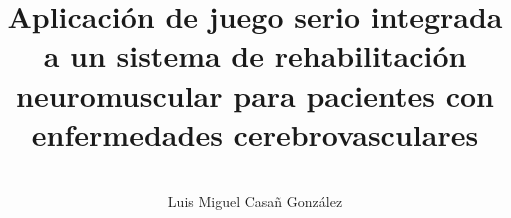 \documentclass{thesis}
\title{Aplicación de juego serio integrada a un sistema de rehabilitación  neuromuscular para pacientes con enfermedades cerebrovasculares}
\author{\\\vspace{0.25cm}Luis Miguel Casañ González}
\begin{document}
    \maketitle

    \thesisgeometry

    
    
    
    
    
    
    
    
    
    

    
    
    
    
\end{document}
